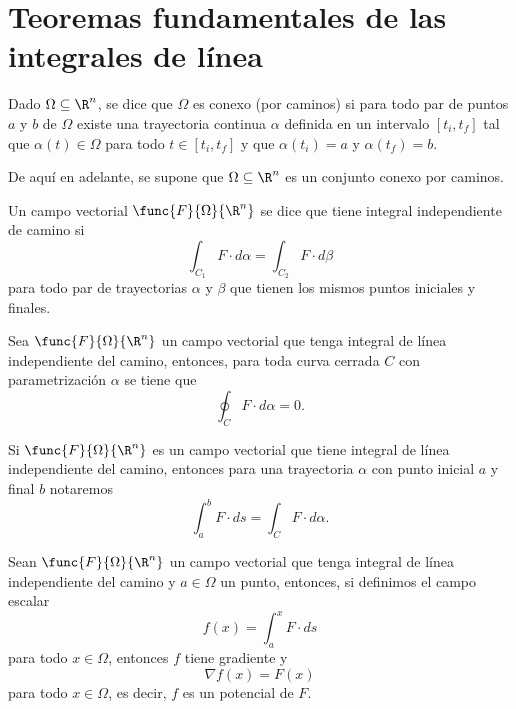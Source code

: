\documentclass[a4,11pt]{aleph-notas}
\begin{document}
\section{Teoremas fundamentales de las integrales de línea}

\begin{defi}
    Dado $\Omega\subseteq \R^n$, se dice que $\Omega$ es conexo (por caminos) si para todo par de puntos $a$ y $b$ de $\Omega$ existe una trayectoria continua $\alpha$ definida en un intervalo $[t_i,t_f]$ tal que $\alpha(t)\in \Omega$ para todo $t\in[t_i,t_f]$ y que $\alpha(t_i)=a$ y $\alpha(t_f)=b$.
\end{defi}

De aquí en adelante, se supone que $\Omega\subseteq \R^n$ es un conjunto conexo por caminos.

\begin{defi}
    Un campo vectorial $\func{F}{\Omega}{\R^n}$ se dice que tiene integral independiente de camino si
    \[
        \int_{C_1} F\cdot d\alpha = \int_{C_2} F\cdot d\beta
    \]
    para todo par de trayectorias $\alpha$ y $\beta$ que tienen los mismos puntos iniciales y finales.
\end{defi}

\begin{prop}
    Sea $\func{F}{\Omega}{\R^n}$ un campo vectorial que tenga integral de línea independiente del camino, entonces, para toda curva cerrada $C$ con parametrización $\alpha$ se tiene que
    \[
        \oint_C F\cdot d\alpha = 0.
    \]
\end{prop}

\begin{advertencia}
    Si $\func{F}{\Omega}{\R^n}$ es un campo vectorial que tiene integral de línea independiente del camino, entonces para una trayectoria $\alpha$ con punto inicial $a$ y final $b$ notaremos
    \[
        \int_a^b F\cdot ds = \int_C F\cdot d\alpha.
    \]
\end{advertencia}

\begin{teo}
    Sean $\func{F}{\Omega}{\R^n}$ un campo vectorial que tenga integral de línea independiente del camino y $a\in \Omega$ un punto, entonces, si definimos el campo escalar
    \[
        f(x) = \int_a^x F\cdot ds
    \]
    para todo $x\in \Omega$, entonces $f$ tiene gradiente y
    \[
        \nabla f(x) = F(x)
    \]
    para todo $x\in \Omega$, es decir, $f$ es un potencial de $F$.
\end{teo}
\end{document}

